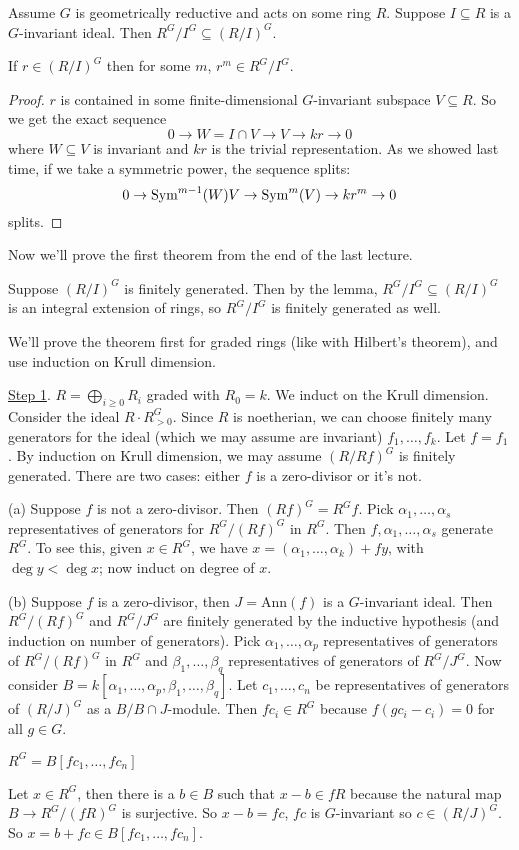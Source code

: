 
Assume $G$ is geometrically reductive and acts on some ring $R$. Suppose $I\subseteq R$ is a $G$-invariant ideal.  Then $R^G/I^G\subseteq (R/I)^G$.
\begin{lemma}
 If $r\in (R/I)^G$ then for some $m$, $r^m\in R^G/I^G$.
\end{lemma}
\begin{proof}
 $r$ is contained in some finite-dimensional $G$-invariant subspace $V\subseteq R$. So we get the exact sequence
 \[
  0\to W=I\cap V\to V\to kr\to 0
 \]
 where $W\subseteq V$ is invariant and $kr$ is the trivial representation. As we showed last time, if we take a symmetric power, the sequence splits:
 \[
  0\to \operatorname{Sym}^{m-1}(W)V\to \operatorname{Sym}^m(V)\to kr^m\to 0
 \]
 splits.
\end{proof}
Now we'll prove the first theorem from the end of the last lecture.
\begin{remark}
 Suppose $(R/I)^G$ is finitely generated. Then by the lemma, $R^G/I^G\subseteq (R/I)^G$ is an integral extension of rings, so $R^G/I^G$ is finitely generated as well.
\end{remark}
We'll prove the theorem first for graded rings (like with Hilbert's theorem), and use induction on Krull dimension.

\underline{Step 1}. $R=\bigoplus_{i\ge 0} R_i$ graded with $R_0=k$. We induct on the Krull dimension. Consider the ideal $R\cdot R^G_{>0}$. Since $R$ is noetherian, we can choose finitely many generators for the ideal (which we may assume are invariant) $f_1,\dots, f_k$. Let $f=f_1$. By induction on Krull dimension, we may assume $(R/Rf)^G$ is finitely generated. There are two cases: either $f$ is a zero-divisor or it's not.

(a) Suppose $f$ is not a zero-divisor. Then $(Rf)^G=R^Gf$. Pick $\alpha_1,\dots, \alpha_s$ representatives of generators for $R^G/(Rf)^G$ in $R^G$. Then $f,\alpha_1,\dots, \alpha_s$ generate $R^G$. To see this, given $x\in R^G$, we have $x=(\alpha_1,\dots, \alpha_k)+fy$, with $\deg y<\deg x$; now induct on degree of $x$.

(b) Suppose $f$ is a zero-divisor, then $J=\mathrm{Ann}(f)$ is a $G$-invariant ideal. Then $R^G/(Rf)^G$ and $R^G/J^G$ are finitely generated by the inductive hypothesis (and induction on number of generators). Pick $\alpha_1,\dots, \alpha_p$ representatives of generators of $R^G/(Rf)^G$ in $R^G$ and $\beta_1,\dots, \beta_q$ representatives of generators of $R^G/J^G$. Now consider $B=k[\alpha_1,\dots, \alpha_p,\beta_1,\dots, \beta_q]$. Let $c_1,\dots, c_n$ be representatives of generators of $(R/J)^G$ as a $B/B\cap J$-module. Then $fc_i\in R^G$ because $f(gc_i-c_i)=0$ for all $g\in G$.
\begin{claim}
 $R^G=B[fc_1,\dots, fc_n]$
\end{claim}
Let $x\in R^G$, then there is a $b\in B$ such that $x-b\in fR$ because the natural map $B\to R^G/(fR)^G$ is surjective. So $x-b=fc$, $fc$ is $G$-invariant so $c\in (R/J)^G$. So $x=b+fc\in B[fc_1,\dots, fc_n]$.

